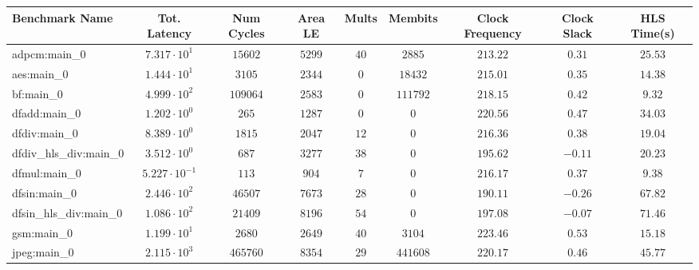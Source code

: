 \begin{tabular}{|l|c|c|c|c|c|c|c|c|}
\hline
Benchmark Name          & Tot. Latency            & Num Cycles & Area LE   & Mults   & Membits    & Clock Frequency & Clock Slack & HLS Time(s) \\
\hline
adpcm:main\_0           & $ 7.317 \cdot 10^{1}  $ & $ 15602  $ & $ 5299  $ & $ 40  $ & $ 2885   $ & $ 213.22      $ & $ 0.31    $ & $ 25.53   $ \\
aes:main\_0             & $ 1.444 \cdot 10^{1}  $ & $ 3105   $ & $ 2344  $ & $ 0   $ & $ 18432  $ & $ 215.01      $ & $ 0.35    $ & $ 14.38   $ \\
bf:main\_0              & $ 4.999 \cdot 10^{2}  $ & $ 109064 $ & $ 2583  $ & $ 0   $ & $ 111792 $ & $ 218.15      $ & $ 0.42    $ & $ 9.32    $ \\
dfadd:main\_0           & $ 1.202 \cdot 10^{0}  $ & $ 265    $ & $ 1287  $ & $ 0   $ & $ 0      $ & $ 220.56      $ & $ 0.47    $ & $ 34.03   $ \\
dfdiv:main\_0           & $ 8.389 \cdot 10^{0}  $ & $ 1815   $ & $ 2047  $ & $ 12  $ & $ 0      $ & $ 216.36      $ & $ 0.38    $ & $ 19.04   $ \\
dfdiv\_hls\_div:main\_0 & $ 3.512 \cdot 10^{0}  $ & $ 687    $ & $ 3277  $ & $ 38  $ & $ 0      $ & $ 195.62      $ & $ -0.11   $ & $ 20.23   $ \\
dfmul:main\_0           & $ 5.227 \cdot 10^{-1} $ & $ 113    $ & $ 904   $ & $ 7   $ & $ 0      $ & $ 216.17      $ & $ 0.37    $ & $ 9.38    $ \\
dfsin:main\_0           & $ 2.446 \cdot 10^{2}  $ & $ 46507  $ & $ 7673  $ & $ 28  $ & $ 0      $ & $ 190.11      $ & $ -0.26   $ & $ 67.82   $ \\
dfsin\_hls\_div:main\_0 & $ 1.086 \cdot 10^{2}  $ & $ 21409  $ & $ 8196  $ & $ 54  $ & $ 0      $ & $ 197.08      $ & $ -0.07   $ & $ 71.46   $ \\
gsm:main\_0             & $ 1.199 \cdot 10^{1}  $ & $ 2680   $ & $ 2649  $ & $ 40  $ & $ 3104   $ & $ 223.46      $ & $ 0.53    $ & $ 15.18   $ \\
jpeg:main\_0            & $ 2.115 \cdot 10^{3}  $ & $ 465760 $ & $ 8354  $ & $ 29  $ & $ 441608 $ & $ 220.17      $ & $ 0.46    $ & $ 45.77   $ \\

\end{tabular}

